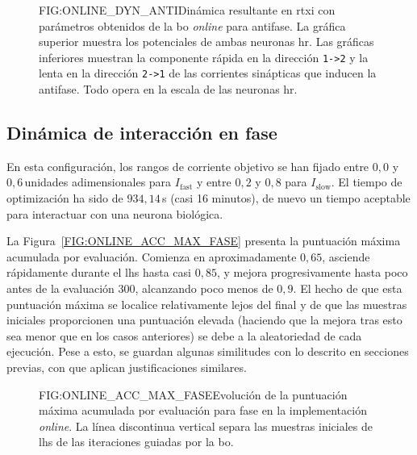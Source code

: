 \begin{figure}[Potenciales de membrana y corriente sináptica en la dinámica resultante de la \acl{bo} \textit{online} en antifase]{FIG:ONLINE_DYN_ANTI}{Dinámica resultante en \ac{rtxi} con parámetros obtenidos de la \ac{bo} \textit{online} para antifase. La gráfica superior muestra los potenciales de ambas neuronas \ac{hr}. Las gráficas inferiores muestran la componente rápida en la dirección \texttt{1->2} y la lenta en la dirección \texttt{2->1} de las corrientes sinápticas que inducen la antifase. Todo opera en la escala de las neuronas \ac{hr}.}
\end{figure}


\subsection{Dinámica de interacción en fase\label{SUBSEC:ONLINE_FASE}}

En esta configuración, los rangos de corriente objetivo se han fijado entre $0{,}0$ y $0{,}6$\,unidades adimensionales para $I_{\mathrm{fast}}$ y entre $0{,}2$ y $0{,}8$ para $I_{\mathrm{slow}}$. El tiempo de optimización ha sido de $934{,}14$\,s (casi 16 minutos), de nuevo un tiempo aceptable para interactuar con una neurona biológica.

La Figura~\ref{FIG:ONLINE_ACC_MAX_FASE} presenta la puntuación máxima acumulada por evaluación. Comienza en aproximadamente $0{,}65$, asciende rápidamente durante el \ac{lhs} hasta casi $0{,}85$, y mejora progresivamente hasta poco antes de la evaluación 300, alcanzando poco menos de $0{,}9$. El hecho de que esta puntuación máxima se localice relativamente lejos del final y de que las muestras iniciales proporcionen una puntuación elevada (haciendo que la mejora tras esto sea menor que en los casos anteriores) se debe a la aleatoriedad de cada ejecución. Pese a esto, se guardan algunas similitudes con lo descrito en secciones previas, con que aplican justificaciones similares.

\begin{figure}[Puntuación máxima acumulada por evaluación de la \acl{bo} \textit{online} en fase]{FIG:ONLINE_ACC_MAX_FASE}{Evolución de la puntuación máxima acumulada por evaluación para fase en la implementación \textit{online}. La línea discontinua vertical separa las muestras iniciales de \ac{lhs} de las iteraciones guiadas por la \ac{bo}.}
\end{figure}

